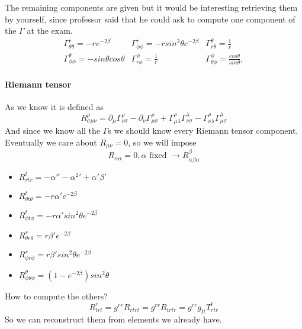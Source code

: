 The remaining components are given but it would be interesting retrieving them by yourself, since professor said that he could ask to compute one component of the $\Gamma $ at the exam.
\begin{equation}
\begin{matrix}
\Gamma ^{r}_{\theta \theta } = - r e^{-2\beta } & \Gamma ^{r}_{\phi \phi } = -r sin^{2}\theta e^{-2\beta } & \Gamma^{\theta }_{r\theta } = \frac{1}{r} \\
\Gamma ^{\theta }_{\phi \phi } = -sin \theta cos \theta  & \Gamma ^{\phi }_{r\phi } = \frac{1}{r} & \Gamma ^{\phi }_{\theta \phi } = \frac{cos \theta }{sin \theta } ,
\end{matrix} 
\end{equation}

\paragraph{Riemann tensor}
As we know it is defined as
\[
R^{\rho }_{\sigma \mu \nu } = \partial_{\mu }\Gamma ^{\rho }_{\nu \sigma }- \partial_{\nu }\Gamma ^{\rho }_{\mu \sigma } + \Gamma ^{\rho }_{\mu \lambda }\Gamma ^{\lambda }_{\nu \sigma }- \Gamma ^{\rho }_{\nu \lambda }\Gamma ^{\lambda }_{\mu \sigma }
\]
And since we know all the $\Gamma$s we should know every Riemann tensor component. Eventually we care about $R_{\mu \nu } = 0$, so we will impose
\[
R_{\alpha \alpha } = 0, \alpha \text{ fixed } \to R^{\beta }_{\alpha \beta \alpha }
\]
\begin{itemize}
\item $R^{t}_{rtr} = -\alpha '' -\alpha ^{2}' +\alpha '\beta '$
\item $R^{t}_{\theta  t \theta } = -r \alpha ' e^{-2\beta }$
\item $R^{t}_{\phi t \phi } = -r \alpha ' sin^{2} \theta  e^{-2\beta }$
\item $R^{r}_{\theta r \theta } = r\beta ' e^{-2\beta }$
\item $R^{r}_{\phi r \phi } = r \beta ' sin^{2}\theta  e^{-2\beta }$
\item $R^{\theta }_{\phi \theta \phi } = \left( 1-e^{-2\beta } \right)sin^{2} \theta $
\end{itemize}
How to compute the others?
\begin{equation}
R^{r}_{trt} = g^{rr}R_{rtrt} = g^{rr}R_{trtr} = g^{rr}g_{tt}T^{t}_{rtr}
\end{equation}
So we can reconstruct them from elements we already have.

